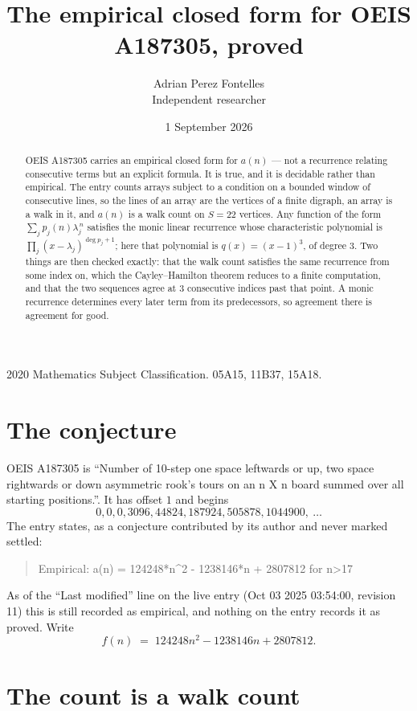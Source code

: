 \documentclass[11pt,a4paper]{article}
\title{The empirical closed form for OEIS A187305, proved}
\author{Adrian Perez Fontelles\\ \small Independent researcher}
\date{1 September 2026}
\theoremstyle{plain}
\theoremstyle{definition}
\begin{document}
\maketitle

\begin{abstract}
OEIS A187305 carries an empirical closed form for $a(n)$ --- not a recurrence relating
consecutive terms but an explicit formula. It is true, and it is decidable rather than
empirical. The entry counts arrays subject to a condition on a bounded window of consecutive lines, so the lines of an array are the
vertices of a finite digraph, an array is a walk in it, and $a(n)$ is a walk count on
$S=22$ vertices. Any function of the form $\sum_j p_j(n)\lambda_j^{\,n}$ satisfies the
monic linear recurrence whose characteristic polynomial is
$\prod_j(x-\lambda_j)^{\deg p_j+1}$; here that polynomial is $q(x)=(x-1)^{3}$, of degree
$3$. Two things are then checked exactly: that the walk count satisfies the same
recurrence from some index on, which the Cayley--Hamilton theorem reduces to a finite
computation, and that the two sequences agree at $3$ consecutive indices past that
point. A monic recurrence determines every later term from its predecessors, so agreement
there is agreement for good.
\end{abstract}

\noindent\small 2020 Mathematics Subject Classification. 05A15, 11B37, 15A18.\normalsize

\section{The conjecture}

OEIS A187305 is ``Number of 10-step one space leftwards or up, two space rightwards or down asymmetric rook's tours on an n X n board summed over all starting positions.''. It has offset $1$ and begins
\[
0, 0, 0, 3096, 44824, 187924, 505878, 1044900,\ \dots
\]
The entry states, as a conjecture contributed by its author and never marked settled:
\begin{quote}
Empirical: a(n) = 124248*n\^{}2 - 1238146*n + 2807812 for n>17
\end{quote}
As of the ``Last modified'' line on the live entry (Oct 03 2025 03:54:00, revision 11) this is still
recorded as empirical, and nothing on the entry records it as proved. Write
\[
f(n)\;=\;124248 n^{2} - 1238146 n + 2807812.
\]

\section{The count is a walk count}
\end{document}
